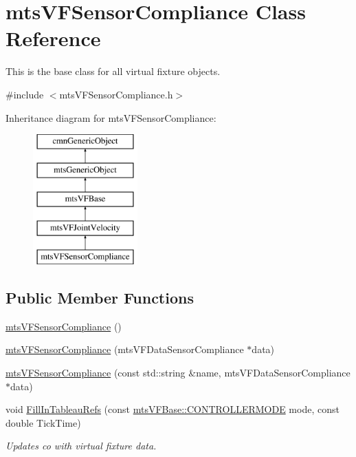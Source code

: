 \hypertarget{classmts_v_f_sensor_compliance}{\section{mts\-V\-F\-Sensor\-Compliance Class Reference}
\label{classmts_v_f_sensor_compliance}
}


This is the base class for all virtual fixture objects.  




{\ttfamily \#include $<$mts\-V\-F\-Sensor\-Compliance.\-h$>$}

Inheritance diagram for mts\-V\-F\-Sensor\-Compliance\-:\begin{figure}[H]
\begin{center}
\leavevmode
\includegraphics[height=5.000000cm]{d8/d19/classmts_v_f_sensor_compliance}
\end{center}
\end{figure}
\subsection*{Public Member Functions}
\begin{DoxyCompactItemize}
\item 
\hyperlink{classmts_v_f_sensor_compliance_a04149c581d37be0d4eef8c4b0400a23d}{mts\-V\-F\-Sensor\-Compliance} ()
\item 
\hyperlink{classmts_v_f_sensor_compliance_a0c318ec723ca96689e21368edf0be9d3}{mts\-V\-F\-Sensor\-Compliance} (mts\-V\-F\-Data\-Sensor\-Compliance $\ast$data)
\item 
\hyperlink{classmts_v_f_sensor_compliance_a79a35b2ec8e99b4c7388826c69369058}{mts\-V\-F\-Sensor\-Compliance} (const std\-::string \&name, mts\-V\-F\-Data\-Sensor\-Compliance $\ast$data)
\item 
void \hyperlink{classmts_v_f_sensor_compliance_ade8b115639befe8b99fbe700ef092c06}{Fill\-In\-Tableau\-Refs} (const \hyperlink{classmts_v_f_base_a742dd08f8b70bafeb746cec14d9ee974}{mts\-V\-F\-Base\-::\-C\-O\-N\-T\-R\-O\-L\-L\-E\-R\-M\-O\-D\-E} mode, const double Tick\-Time)
\begin{DoxyCompactList}\small\item\em Updates co with virtual fixture data. \end{DoxyCompactList}\end{DoxyCompactItemize}
